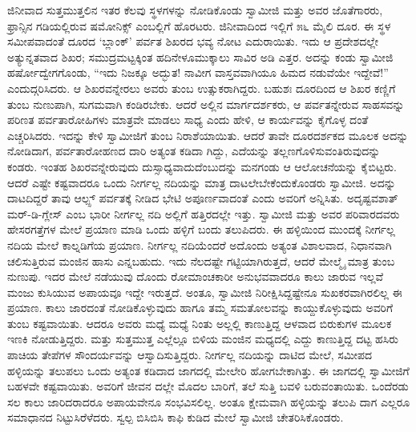 ಜಿನೀವಾದ ಸುತ್ತಮುತ್ತಲಿನ ಇತರ ಕೆಲವು ಸ್ಥಳಗಳನ್ನು ನೋಡಿಕೊಂಡು ಸ್ವಾಮೀಜಿ ಮತ್ತು ಅವರ ಜೊತೆಗಾರರು, ಫ್ರಾನ್ಸಿನ ಗಡಿಯಲ್ಲಿರುವ ಷಮೋನಿಕ್ಸ್ ಎಂಬಲ್ಲಿಗೆ ಹೊರಟರು. ಜಿನೀವಾದಿಂದ ಇಲ್ಲಿಗೆ ೫೬ ಮೈಲಿ ದೂರ. ಈ ಸ್ಥಳ ಸಮೀಪವಾದಂತೆ ದೂರದ ‘ಬ್ಲಾಂಕ್​’ ಪರ್ವತ ಶಿಖರದ ಭವ್ಯ ನೋಟ ಎದುರಾಯಿತು. ಇದು ಆ ಪ್ರದೇಶದಲ್ಲೇ ಅತ್ಯುನ್ನತವಾದ ಶಿಖರ; ಸಮುದ್ರಮಟ್ಟಕ್ಕಿಂತ ಹದಿನೇಳೂಮುಕ್ಕಾಲು ಸಾವಿರ ಅಡಿ ಎತ್ತರ. ಅದನ್ನು ಕಂಡು ಸ್ವಾಮೀಜಿ ಹರ್ಷೋದ್ವೇಗಗೊಂಡು, “ಇದು ನಿಜಕ್ಕೂ ಅದ್ಭುತ! ನಾವೀಗ ವಾಸ್ತವವಾಗಿಯೂ ಹಿಮದ ನಡುವೆಯೇ ಇದ್ದೇವೆ!” ಎಂದುದ್ಗರಿಸಿದರು. ಆ ಶಿಖರವನ್ನೇರಲು ಅವರು ತುಂಬ ಉತ್ಸುಕರಾಗಿದ್ದರು. ಬಹುಶಃ ದೂರದಿಂದ ಆ ಶಿಖರ ಕಣ್ಣಿಗೆ ತುಂಬ ನುಣುಪಾಗಿ, ಸುಗಮವಾಗಿ ಕಂಡಿರಬೇಕು. ಆದರೆ ಅಲ್ಲಿನ ಮಾರ್ಗದರ್ಶಕರು, ಆ ಪರ್ವತನ್ನೇರುವ ಸಾಹಸವನ್ನು ಪರಿಣತ ಪರ್ವತಾರೋಹಿಗಳು ಮಾತ್ರವೇ ಮಾಡಲು ಸಾಧ್ಯ ಎಂದು ಹೇಳಿ, ಆ ಕಾರ್ಯವನ್ನು ಕೈಗೊಳ್ಳ ದಂತೆ ಎಚ್ಚರಿಸಿದರು. ಇದನ್ನು ಕೇಳಿ ಸ್ವಾಮೀಜಿಗೆ ತುಂಬ ನಿರಾಶೆಯಾಯಿತು. ಆದರೆ ತಾವೇ ದೂರದರ್ಶಕದ ಮೂಲಕ ಅದನ್ನು ನೋಡಿದಾಗ, ಪರ್ವತಾರೋಹಣದ ದಾರಿ ಅತ್ಯಂತ ಕಡಿದಾ ಗಿದ್ದು, ಎದೆಯನ್ನು ತಲ್ಲಣಗೊಳಿಸುವಂತಿರುವುದನ್ನು ಕಂಡರು. ಇಂತಹ ಶಿಖರವನ್ನೇರುವುದು ದುಸ್ಸಾಧ್ಯವಾದುದೆಂಬುದನ್ನು ಮನಗಂಡು ಆ ಆಲೋಚನೆಯನ್ನು ಕೈಬಿಟ್ಟರು. ಆದರೆ ಎಷ್ಟೇ ಕಷ್ಟವಾದರೂ ಒಂದು ನೀರ್ಗಲ್ಲ ನದಿಯನ್ನು ಮಾತ್ರ ದಾಟಲೇಬೇಕೆಂದುಕೊಂಡರು ಸ್ವಾಮೀಜಿ. ಅದನ್ನು ದಾಟದಿದ್ದರೆ ತಾವು ಆಲ್ಪ್ಸ್ ಪರ್ವತಕ್ಕೆ ನೀಡಿದ ಭೇಟಿ ಅಪೂರ್ಣವಾದಂತೆ ಎಂದು ಅವರಿಗೆ ಅನ್ನಿಸಿತು. ಅದೃಷ್ಟವಶಾತ್ ಮರ್​-ಡಿ-ಗ್ಲೇಸ್ ಎಂಬ ಭಾರೀ ನೀರ್ಗಲ್ಲ ನದಿ ಅಲ್ಲಿಗೆ ಹತ್ತಿರದಲ್ಲೇ ಇತ್ತು. ಸ್ವಾಮೀಜಿ ಮತ್ತು ಅವರ ಪರಿವಾರದವರು ಹೇಸರಗತ್ತೆಗಳ ಮೇಲೆ ಪ್ರಯಾಣ ಮಾಡಿ ಒಂದು ಹಳ್ಳಿಗೆ ಬಂದು ತಲುಪಿದರು. ಈ ಹಳ್ಳಿಯಿಂದ ಮುಂದಕ್ಕೆ ನೀರ್ಗಲ್ಲ ನದಿಯ ಮೇಲೆ ಕಾಲ್ನಡಿಗೆಯ ಪ್ರಯಾಣ. ನೀರ್ಗಲ್ಲ ನದಿಯೆಂದರೆ ಅದೊಂದು ಅತ್ಯಂತ ವಿಶಾಲವಾದ, ನಿಧಾನವಾಗಿ ಚಲಿಸುತ್ತಿರುವ ಮಂಜಿನ ಹಾಸು ಎನ್ನಬಹುದು. ಇದು ನೆಲದಷ್ಟೇ ಗಟ್ಟಿಯಾಗಿರುತ್ತದೆ, ಆದರೆ ಮೇಲ್ಮೈ ಮಾತ್ರ ತುಂಬ ನುಣುಪು. ಇದರ ಮೇಲೆ ನಡೆಯುವು ದೊಂದು ರೋಮಾಂಚಕಾರೀ ಅನುಭವವಾದರೂ ಕಾಲು ಜಾರುವ ಇಲ್ಲವೆ ಮಂಜು ಕುಸಿಯುವ ಅಪಾಯವೂ ಇದ್ದೇ ಇರುತ್ತದೆ. ಅಂತೂ, ಸ್ವಾಮೀಜಿ ನಿರೀಕ್ಷಿಸಿದ್ದಷ್ಟೇನೂ ಸುಖಕರವಾಗಿರಲಿಲ್ಲ ಈ ಪ್ರಯಾಣ. ಕಾಲು ಜಾರದಂತೆ ನೋಡಿಕೊಳ್ಳುವುದು ಹಾಗೂ ತಮ್ಮ ಸಮತೋಲವನ್ನು ಕಾಯ್ದುಕೊಳ್ಳುವುದು ಅವರಿಗೆ ತುಂಬ ಕಷ್ಟವಾಯಿತು. ಆದರೂ ಅವರು ಮಧ್ಯೆ ಮಧ್ಯೆ ನಿಂತು ಅಲ್ಲಲ್ಲಿ ಕಾಣುತ್ತಿದ್ದ ಆಳವಾದ ಬಿರುಕುಗಳ ಮೂಲಕ ಇಣಕಿ ನೋಡುತ್ತಿದ್ದರು. ಮತ್ತು ಸುತ್ತಮುತ್ತ ಎಲ್ಲೆಲ್ಲೂ ಬಿಳಿಯ ಮಂಜಿನ ಮಧ್ಯದಲ್ಲಿ ಎದ್ದು ಕಾಣುತ್ತಿದ್ದ ದಟ್ಟ ಹಸಿರು ಪಾಚಿಯ ತೇಪೆಗಳ ಸೌಂದರ್ಯವನ್ನು ಆಸ್ವಾದಿಸುತ್ತಿದ್ದರು. ನೀರ್ಗಲ್ಲ ನದಿಯನ್ನು ದಾಟಿದ ಮೇಲೆ, ಸಮೀಪದ ಹಳ್ಳಿಯನ್ನು ತಲುಪಲು ಒಂದು ಅತ್ಯಂತ ಕಡಿದಾದ ಜಾಗದಲ್ಲಿ ಮೇಲೇರಿ ಹೋಗಬೇಕಾಗಿತ್ತು. ಈ ಜಾಗದಲ್ಲಿ ಸ್ವಾಮೀಜಿಗೆ ಬಹಳವೇ ಕಷ್ಟವಾಯಿತು. ಅವರಿಗೆ ಜೀವನ ದಲ್ಲೇ ಮೊದಲ ಬಾರಿಗೆ, ತಲೆ ಸುತ್ತಿ ಬವಳಿ ಬರುವಂತಾಯಿತು. ಒಂದೆರಡು ಸಲ ಕಾಲು ಜಾರಿದರಾದರೂ ಅಪಾಯವೇನೂ ಸಂಭವಿಸಲಿಲ್ಲ. ಅಂತೂ ಕ್ಷೇಮವಾಗಿ ಹಳ್ಳಿಯನ್ನು ತಲುಪಿ ದಾಗ ಎಲ್ಲರೂ ಸಮಾಧಾನದ ನಿಟ್ಟುಸಿರೆಳೆದರು. ಸ್ವಲ್ಪ ಬಿಸಿಬಿಸಿ ಕಾಫಿ ಕುಡಿದ ಮೇಲೆ ಸ್ವಾಮೀಜಿ ಚೇತರಿಸಿಕೊಂಡರು.

